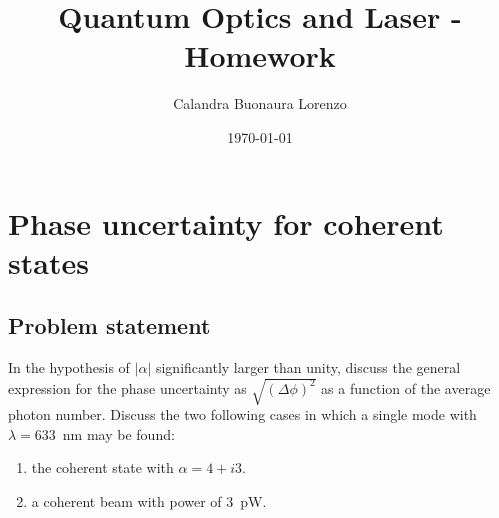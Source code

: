 \documentclass[prl, 11 pt]{revtex4-2}
\begin{document}
\title{Quantum Optics and Laser - Homework}

\author{Calandra Buonaura Lorenzo}

\date{\today}

\maketitle

\section{Phase uncertainty for coherent states}
\subsection{Problem statement}
In the hypothesis of $|\alpha|$ significantly larger than unity, discuss the general expression for the phase uncertainty as $\sqrt{(\Delta \phi)^2}$ as a function of the average photon number. Discuss the two following cases in which a single mode with $\lambda = 633$~nm may be found:
\begin{enumerate}
    \item the coherent state with $\alpha = 4 + i3$.
    \item a coherent beam with power of $3$~pW.
\end{enumerate}
\end{document}
